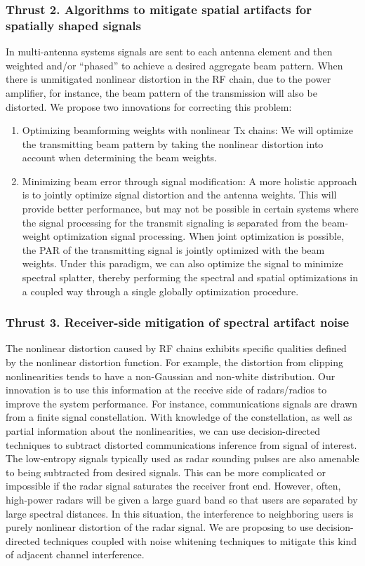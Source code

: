 \documentclass[11pt,onecolumn]{IEEEtran}
\begin{document}
\subsubsection{Thrust 2.  Algorithms to mitigate spatial artifacts for spatially shaped signals}
In multi-antenna systems signals are sent to each antenna element and then weighted and/or “phased” to achieve a desired aggregate beam pattern.  When there is unmitigated nonlinear distortion in the RF chain, due to the power amplifier, for instance, the beam pattern of the transmission will also be distorted.  We propose two innovations for correcting this problem:
\renewcommand{\theenumi}{\roman{enumi}}%
\begin{enumerate}
\item Optimizing beamforming weights with nonlinear Tx chains: We will optimize the transmitting beam pattern by taking the nonlinear distortion into account when determining the beam weights.  
\item Minimizing beam error through signal modification: A more holistic approach is to jointly optimize signal distortion and the antenna weights.  This will provide better performance, but may not be possible in certain systems where the signal processing for the transmit signaling is separated from the beam-weight optimization signal processing.  When joint optimization is possible, the PAR of the transmitting signal is jointly optimized with the beam weights.  Under this paradigm, we can also optimize the signal to minimize spectral splatter, thereby performing the spectral and spatial optimizations in a coupled way through a single globally optimization procedure.
\end{enumerate}

\subsubsection{Thrust 3.  Receiver-side mitigation of spectral artifact noise}
The nonlinear distortion caused by RF chains exhibits specific qualities defined by the nonlinear distortion function.  For example, the distortion from clipping nonlinearities tends to have a non-Gaussian and non-white distribution.  Our innovation is to use this information at the receive side of radars/radios to improve the system performance.  For instance, communications signals are drawn from a finite signal constellation.  With knowledge of the constellation, as well as partial information about the nonlinearities, we can use decision-directed techniques to subtract distorted communications inference from signal of interest.  
The low-entropy signals typically used as radar sounding pulses are also amenable to being subtracted from desired signals. This can be more complicated or impossible if the radar signal saturates the receiver front end.  However, often, high-power radars will be given a large guard band so that users are separated by large spectral distances.  In this situation, the interference to neighboring users is purely nonlinear distortion of the radar signal.  We are proposing to use decision-directed techniques coupled with noise whitening techniques to mitigate this kind of adjacent channel interference. 
\end{document}
